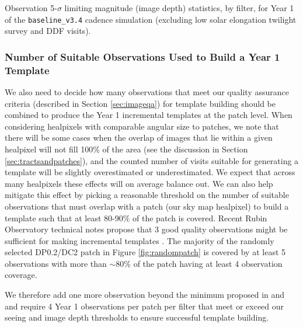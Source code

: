 \documentclass[preprint,linenumbers]{aastex631}
\newcommand{\baseline}{\texttt{baseline\_v3.4}\xspace}
\begin{document}
	\begin{table}
		\centering
		
		\caption{
			Observation 5-$\sigma$ limiting magnitude (image depth) statistics, by filter, for Year 1 of the \baseline cadence simulation (excluding low solar elongation twilight survey and DDF visits).	
		}
		\label{tab:year1_image_depth}
	\end{table}
	
	\subsubsection{Number of Suitable Observations Used to Build a Year 1 Template}
	\label{sec:num_images}
	We also need to decide how many observations that meet our quality assurance criteria (described in Section \ref{sec:imageqa}) for template building should be combined to produce the Year 1 incremental templates at the patch level.  When considering healpixels with comparable angular size to patches, we note that there will be some cases when the overlap of images that lie within a given healpixel will not fill 100\% of the area (see the discussion in Section \ref{sec:tractsandpatches}), and the counted number of visits suitable for generating a template will be slightly overestimated or underestimated. We expect that across many healpixels these effects will on average balance out. We can also help mitigate this effect by picking a reasonable threshold on the number of suitable observations that must overlap with a patch (our sky map healpixel) to build a template such that at least 80-90$\%$ of the patch is covered. Recent Rubin Observatory technical notes propose that 3 good quality observations might be sufficient for making incremental templates \citep{DMTN-107,RTN-011}. The majority of the randomly selected DP0.2/DC2 patch in Figure \ref{fig:randompatch} is covered by at least 5 observations with more than $\sim$80$\%$ of the patch having at least 4 observation coverage. {We therefore add one more observation beyond the minimum proposed in \cite{DMTN-107} and \cite{RTN-011} and require 4 Year 1 observations per patch per filter that meet or exceed our seeing and image depth thresholds to ensure successful template building. %
		
}
\end{document}

